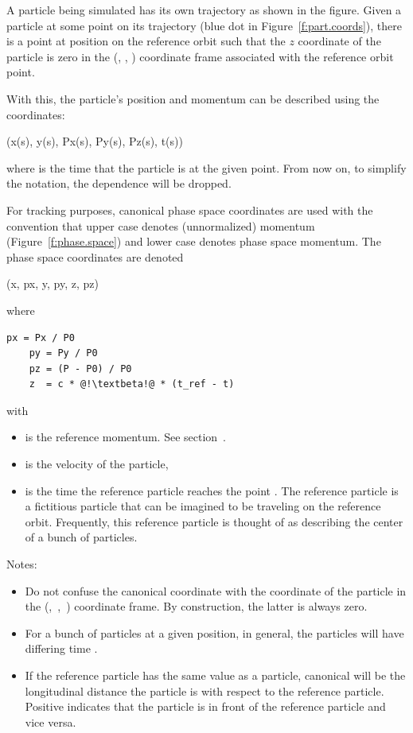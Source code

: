 \documentclass{hitec}     %
\begin{document}
{A particle being simulated has its own trajectory as shown in the figure. Given a particle at some
point on its trajectory (blue dot in Figure~\ref{f:part.coords}), there is a point at position
 on the reference orbit such that the $z$ coordinate of the particle is zero in the (,
, ) coordinate frame associated with the reference orbit point.

With this, the particle's position and momentum  can be described using the coordinates:
\begin{code}
    (x(s), y(s), Px(s), Py(s), Pz(s), t(s))
\end{code}
where  is the time that the particle is at the given point. From now on, to simplify the
notation, the  dependence will be dropped.

For tracking purposes, canonical phase space coordinates are used with the convention that upper
case  denotes (unnormalized) momentum (Figure~\ref{f:phase.space}) and lower case 
denotes phase space momentum. The phase space coordinates are denoted
\begin{code}
    (x, px, y, py, z, pz)
\end{code}
where
\begin{lstlisting}[mathescape]
    px = Px / P0
    py = Py / P0
    pz = (P - P0) / P0
    z  = c * @!\textbeta!@ * (t_ref - t)
\end{lstlisting}
with
\vspace{-5 pt}
\begin{itemize}
\item {} is the reference momentum. See section~.
\item {} is the velocity of the particle, 
\item {} is the time the reference particle reaches the point . The reference
particle is a fictitious particle that can be imagined to be traveling on the reference orbit.
Frequently, this reference particle is thought of as describing the center of a bunch of particles.
\end{itemize}
Notes:
\vspace{-5 pt}
\begin{itemize}
\item
Do not confuse the canonical  coordinate with the  coordinate of the particle in the
(,~,~) coordinate frame. By construction, the latter is always zero.
\item 
For a bunch of particles at a given  position, in general, the particles will have differing
time .
\item 
If the reference particle has the same {\textbeta} value as a particle, canonical  will be the
longitudinal distance the particle is with respect to the reference particle. Positive 
indicates that the particle is in front of the reference particle and vice versa.
\end{itemize}


}
\end{document}
